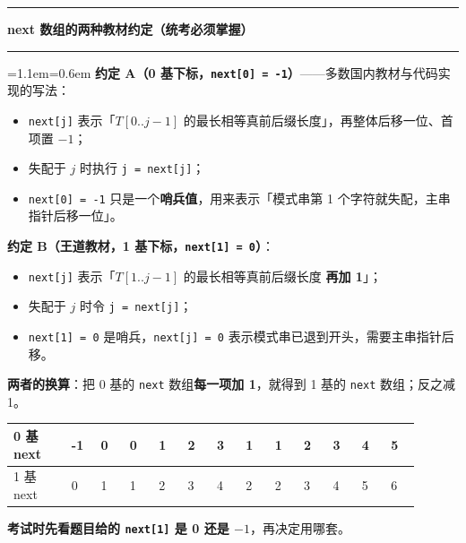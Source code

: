 \documentclass[11pt,openany,UTF8]{ctexbook}
\newcommand{\callouthead}[2]{%
  \par\addvspace{7pt}\noindent
  {\color{#1}\rule[-0.15em]{3pt}{1.05em}}\hspace{0.5em}%
  {\bfseries\color{#1}#2}\par\nobreak\vspace{-0.35em}%
  {\color{rulesep}\hrule height 0.4pt}\nobreak\vspace{0.45em}%
  \begingroup\small\setlength{\parindent}{0pt}%
  \leftskip=1.1em\rightskip=0.6em\noindent\ignorespaces}
\newcommand{\calloutend}{\par\endgroup\addvspace{7pt}}
\newenvironment{callkey}[1]{\callouthead{keybar}{#1}}{\calloutend}
\begin{document}
\begin{callkey}{next 数组的两种教材约定（统考必须掌握）}
\textbf{约定 A（0 基下标，\texttt{next[0]\allowbreak{} =\allowbreak{} -1}）}——多数国内教材与代码实现的写法：

\begin{itemize}
\item \texttt{next[j]\allowbreak{}} 表示「$T[0..j-1]$ 的最长相等真前后缀长度」，再整体后移一位、首项置 $-1$；
\item 失配于 $j$ 时执行 \texttt{j =\allowbreak{} next[j]\allowbreak{}}；
\item \texttt{next[0]\allowbreak{} =\allowbreak{} -1} 只是一个\textbf{哨兵值}，用来表示「模式串第 1 个字符就失配，主串指针后移一位」。
\end{itemize}
\textbf{约定 B（王道教材，1 基下标，\texttt{next[1]\allowbreak{} =\allowbreak{} 0}）}：

\begin{itemize}
\item \texttt{next[j]\allowbreak{}} 表示「$T[1..j-1]$ 的最长相等真前后缀长度 \textbf{再加 1}」；
\item 失配于 $j$ 时令 \texttt{j =\allowbreak{} next[j]\allowbreak{}}；
\item \texttt{next[1]\allowbreak{} =\allowbreak{} 0} 是哨兵，\texttt{next[j]\allowbreak{} =\allowbreak{} 0} 表示模式串已退到开头，需要主串指针后移。
\end{itemize}
\textbf{两者的换算}：把 0 基的 \texttt{next} 数组\textbf{每一项加 1}，就得到 1 基的 \texttt{next} 数组；反之减 1。

\begingroup\footnotesize\setlength{\tabcolsep}{1.5pt}
\begin{longtable}{@{}L{0.1280\linewidth}L{0.0640\linewidth}L{0.0640\linewidth}L{0.0640\linewidth}L{0.0640\linewidth}L{0.0640\linewidth}L{0.0640\linewidth}L{0.0640\linewidth}L{0.0640\linewidth}L{0.0640\linewidth}L{0.0640\linewidth}L{0.0640\linewidth}L{0.0640\linewidth}@{}}
\toprule
\textbf{0 基 next} & \textbf{-1} & \textbf{0} & \textbf{0} & \textbf{1} & \textbf{2} & \textbf{3} & \textbf{1} & \textbf{1} & \textbf{2} & \textbf{3} & \textbf{4} & \textbf{5} \\
\midrule
{} 基 next & 0 & 1 & 1 & 2 & 3 & 4 & 2 & 2 & 3 & 4 & 5 & 6 \\
\bottomrule
\end{longtable}
\endgroup

\textbf{考试时先看题目给的 \texttt{next[1]\allowbreak{}} 是 0 还是 $-1$}，再决定用哪套。

\end{callkey}
\end{document}
